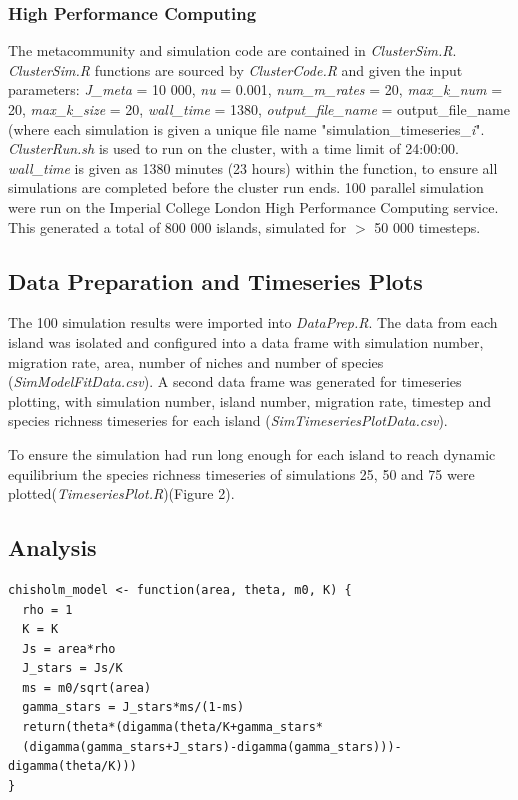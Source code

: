 \documentclass{article}
\begin{document}
\subsubsection{High Performance Computing}
The metacommunity and simulation code are contained in \textit{ClusterSim.R}. \textit{ClusterSim.R} functions are sourced by \textit{ClusterCode.R} and given the input parameters: \textit{J\_meta} = 10 000, \textit{nu} = 0.001, \textit{num\_m\_rates} = 20, \textit{max\_k\_num} = 20, \textit{max\_k\_size} = 20, \textit{wall\_time} = 1380, \textit{output\_file\_name} = output\_file\_name (where each simulation is given a unique file name "simulation\_timeseries\_\textit{i}". \textit{ClusterRun.sh} is used to run on the cluster, with a time limit of 24:00:00. \textit{wall\_time} is given as 1380 minutes (23 hours) within the function, to ensure all simulations are completed before the cluster run ends. 100 parallel simulation were run on the Imperial College London High Performance Computing service. This generated a total of 800 000 islands, simulated for $>$ 50 000 timesteps.   

\subsection{Data Preparation and Timeseries Plots}
The 100 simulation results were imported into \textit{DataPrep.R}. The data from each island was isolated and configured into a data frame with simulation number, migration rate, area, number of niches and number of species (\textit{SimModelFitData.csv}). A second data frame was generated for timeseries plotting, with simulation number, island number, migration rate, timestep and species richness timeseries for each island (\textit{SimTimeseriesPlotData.csv}).\bigskip

\noindent To ensure the simulation had run long enough for each island to reach dynamic equilibrium the species richness timeseries of simulations 25, 50 and 75 were plotted(\textit{TimeseriesPlot.R})(Figure 2).

\subsection{Analysis}\bigskip

\begin{verbatim}
chisholm_model <- function(area, theta, m0, K) {
  rho = 1
  K = K
  Js = area*rho
  J_stars = Js/K
  ms = m0/sqrt(area)
  gamma_stars = J_stars*ms/(1-ms)
  return(theta*(digamma(theta/K+gamma_stars*
  (digamma(gamma_stars+J_stars)-digamma(gamma_stars)))-digamma(theta/K)))
}
\end{verbatim}
\end{document}
